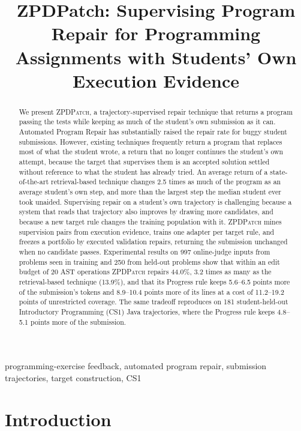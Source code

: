 \documentclass[10pt,conference]{IEEEtran}
\title{ZPDPatch: Supervising Program Repair for Programming Assignments with Students' Own Execution Evidence}
\author{}
\begin{document}
\maketitle
\begin{abstract}
We present \textsc{ZPDPatch}, a trajectory-supervised repair technique that returns a program passing the tests while keeping as much of the student's own submission as it can. Automated Program Repair has substantially raised the repair rate for buggy student submissions. However, existing techniques frequently return a program that replaces most of what the student wrote, a return that no longer continues the student's own attempt, because the target that supervises them is an accepted solution settled without reference to what the student has already tried. An average return of a state-of-the-art retrieval-based technique changes 2.5 times as much of the program as an average student's own step, and more than the largest step the median student ever took unaided. Supervising repair on a student's own trajectory is challenging because a system that reads that trajectory also improves by drawing more candidates, and because a new target rule changes the training population with it. \textsc{ZPDPatch} mines supervision pairs from execution evidence, trains one adapter per target rule, and freezes a portfolio by executed validation repairs, returning the submission unchanged when no candidate passes. Experimental results on 997 online-judge inputs from problems seen in training and 250 from held-out problems show that within an edit budget of 20 AST operations \textsc{ZPDPatch} repairs 44.0\%, 3.2 times as many as the retrieval-based technique (13.9\%), and that its Progress rule keeps 5.6--6.5 points more of the submission's tokens and 8.9--10.4 points more of its lines at a cost of 11.2--19.2 points of unrestricted coverage. The same tradeoff reproduces on 181 student-held-out Introductory Programming (CS1) Java trajectories, where the Progress rule keeps 4.8--5.1 points more of the submission.
\end{abstract}
\begin{IEEEkeywords}
programming-exercise feedback, automated program repair, submission trajectories, target construction, CS1
\end{IEEEkeywords}

\section{Introduction}
\label{sec:introduction}
\end{document}
